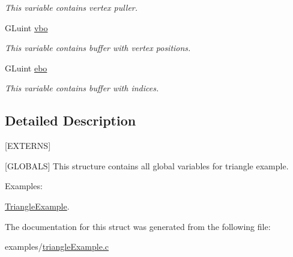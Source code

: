 \begin{DoxyCompactItemize}
\begin{DoxyCompactList}\small\item\em This variable contains vertex puller. \end{DoxyCompactList}\item 
\hypertarget{structTriangleExampleVariables_af3b747228ed4a26fffca56a69838ecae}{G\-Luint \hyperlink{structTriangleExampleVariables_af3b747228ed4a26fffca56a69838ecae}{vbo}}\label{structTriangleExampleVariables_af3b747228ed4a26fffca56a69838ecae}

\begin{DoxyCompactList}\small\item\em This variable contains buffer with vertex positions. \end{DoxyCompactList}\item 
\hypertarget{structTriangleExampleVariables_a9e7c6acc784faacf21bca7c46f9f4244}{G\-Luint \hyperlink{structTriangleExampleVariables_a9e7c6acc784faacf21bca7c46f9f4244}{ebo}}\label{structTriangleExampleVariables_a9e7c6acc784faacf21bca7c46f9f4244}

\begin{DoxyCompactList}\small\item\em This variable contains buffer with indices. \end{DoxyCompactList}\end{DoxyCompactItemize}


\subsection{Detailed Description}
\mbox{[}E\-X\-T\-E\-R\-N\-S\mbox{]} 

\mbox{[}G\-L\-O\-B\-A\-L\-S\mbox{]} This structure contains all global variables for triangle example. \begin{Desc}
\item[Examples\-: ]\par
\hyperlink{TriangleExample-example}{Triangle\-Example}.\end{Desc}


The documentation for this struct was generated from the following file\-:\begin{DoxyCompactItemize}
\item 
examples/\hyperlink{triangleExample_8c}{triangle\-Example.\-c}\end{DoxyCompactItemize}
